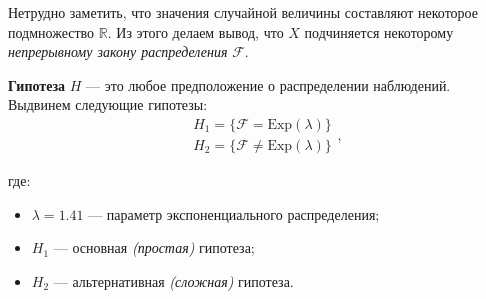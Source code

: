 Нетрудно заметить, что значения случайной величины составляют некоторое подмножество \( \mathbb{R} \). Из этого делаем вывод, что \( X \) подчиняется некоторому \textit{непрерывному закону распределения} \( \mathcal{F} \).

\textbf{Гипотеза} \( H \) --- это любое предположение о распределении наблюдений. Выдвинем следующие гипотезы:
\[
    \begin{aligned}
        &H_1=\{ \mathcal{F}= \textrm{Exp}(\lambda) \}\\
        &H_2=\{ \mathcal{F}\neq \textrm{Exp}(\lambda) \}
    \end{aligned},
\]

где:
\begin{itemize}
    \item \( \lambda=1.41 \) --- параметр экспоненциального распределения;
    \item \( H_1 \) --- основная \textit{(простая)} гипотеза;
    \item \( H_2 \) --- альтернативная \textit{(сложная)} гипотеза.
\end{itemize}